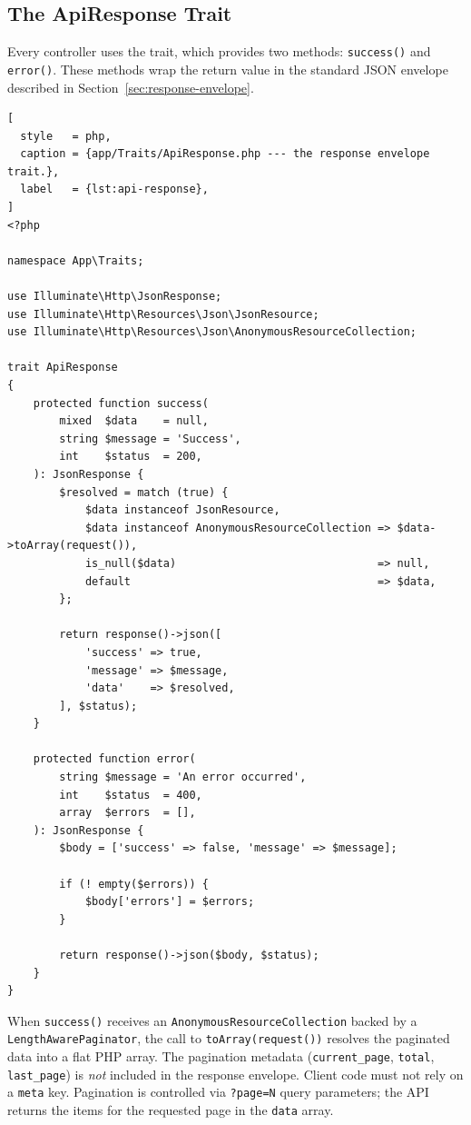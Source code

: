 \subsection{The ApiResponse Trait}

Every controller uses the  trait, which provides
two methods: \texttt{success()} and \texttt{error()}. These methods
wrap the return value in the standard JSON envelope described in
Section~\ref{sec:response-envelope}.

\begin{lstlisting}[
  style   = php,
  caption = {app/Traits/ApiResponse.php --- the response envelope trait.},
  label   = {lst:api-response},
]
<?php

namespace App\Traits;

use Illuminate\Http\JsonResponse;
use Illuminate\Http\Resources\Json\JsonResource;
use Illuminate\Http\Resources\Json\AnonymousResourceCollection;

trait ApiResponse
{
    protected function success(
        mixed  $data    = null,
        string $message = 'Success',
        int    $status  = 200,
    ): JsonResponse {
        $resolved = match (true) {
            $data instanceof JsonResource,
            $data instanceof AnonymousResourceCollection => $data->toArray(request()),
            is_null($data)                               => null,
            default                                      => $data,
        };

        return response()->json([
            'success' => true,
            'message' => $message,
            'data'    => $resolved,
        ], $status);
    }

    protected function error(
        string $message = 'An error occurred',
        int    $status  = 400,
        array  $errors  = [],
    ): JsonResponse {
        $body = ['success' => false, 'message' => $message];

        if (! empty($errors)) {
            $body['errors'] = $errors;
        }

        return response()->json($body, $status);
    }
}
\end{lstlisting}

\begin{warningbox}
  When \texttt{success()} receives an \texttt{AnonymousResourceCollection}
  backed by a \texttt{LengthAwarePaginator}, the call to
  \texttt{toArray(request())} resolves the paginated data into a flat
  PHP array. The pagination metadata (\texttt{current\_page},
  \texttt{total}, \texttt{last\_page}) is \emph{not} included in the
  response envelope. Client code must not rely on a \texttt{meta} key.
  Pagination is controlled via \texttt{?page=N} query parameters;
  the API returns the items for the requested page in the \texttt{data}
  array.
\end{warningbox}

